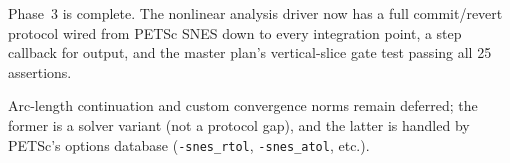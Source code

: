\noindent
Phase~3 is complete.  The nonlinear analysis driver now has a full
commit/revert protocol wired from PETSc SNES down to every integration
point, a step callback for output, and the master plan's vertical-slice
gate test passing all 25 assertions.

Arc-length continuation and custom convergence norms remain deferred;
the former is a solver variant (not a protocol gap), and the latter is
handled by PETSc's options database (\texttt{-snes\_rtol},
\texttt{-snes\_atol}, etc.).
